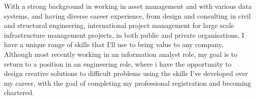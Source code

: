 %
%
%
\par{With a strong background in working in asset management and with various data systems, and having diverse career experience, from design and consulting in civil and structural engineering, international project management for large scale infrastructure management projects, in both public and private organisations, I have a unique range of skills that I'll use to bring value to any company. Although most recently working in an information analyst role, my goal is to return to a position in an engineering role, where i have the opportunity to design creative solutions to difficult problems using the skills I’ve developed over my career, with the goal of completing my professional registration and becoming chartered. \\

}